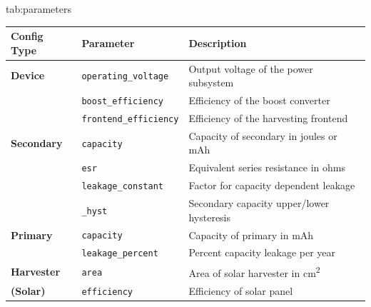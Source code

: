 \begin{definetable}{tab:parameters}
    \centering
    \small
    \begin{tabular}{lll}
\hline
\textbf{Config Type}& \multicolumn{1}{l}{\textbf{Parameter}}                   & \multicolumn{1}{l}{\textbf{Description}} \\ \hline
\textbf{Device}     & \texttt{operating\_voltage}                              & Output voltage of the power subsystem    \\
                    & \texttt{boost\_efficiency}                               & Efficiency of the boost converter        \\
                    & \texttt{frontend\_efficiency}                            & Efficiency of the harvesting frontend    \\ \hline
\textbf{Secondary}  & \texttt{capacity}                                        & Capacity of secondary in joules or mAh   \\
                    & \texttt{esr}                                             & Equivalent series resistance in ohms     \\
                    & \texttt{leakage\_constant}                               & Factor for capacity dependent leakage    \\
                    & \texttt{\string{max, min\string}\_hyst}                  & Secondary capacity upper/lower hysteresis\\ \hline
\textbf{Primary}    & \texttt{capacity}                                        & Capacity of primary in mAh               \\
                    & \texttt{leakage\_percent}                                & Percent capacity leakage per year        \\ \hline
        \textbf{Harvester}  & \texttt{area}                                    & Area of solar harvester in cm\textsuperscript{2}\\
\textbf{(Solar)}    & \texttt{efficiency}                                      & Efficiency of solar panel                \\ \hline

\end{tabular}
\end{definetable}
